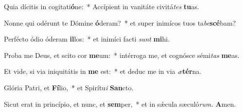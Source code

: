 \item Quia dícitis in cogitati\textbf{ó}ne:~* Accípient in vanitáte civitá\tinyhspace\textit{tes} \textbf{tu}as.
\item Nonne qui odérunt te Dómine \textbf{ó}deram?~* et super inimícos tuos ta\textit{be}\textbf{scé}bam?
\item Perfécto ódio óderam \textbf{il}los:~* et inimíci facti \textit{sunt} \textbf{mi}hi.
\item Proba me Deus, et scito cor \textbf{me}um:~* intérroga me, et cognósce sémi\tinyhspace\textit{tas} \textbf{me}as.
\item Et vide, si via iniquitátis in \textbf{me} est:~* et deduc me in via \textit{æ}\textbf{tér}na.
\item Glória Patri, et \textbf{Fí}lio,~* et Spirítu\textit{i} \textbf{San}cto.
\item Sicut erat in princípio, et nunc, et \textbf{sem}per,~* et in sǽcula sæculó\textit{rum.} \textbf{A}men.
